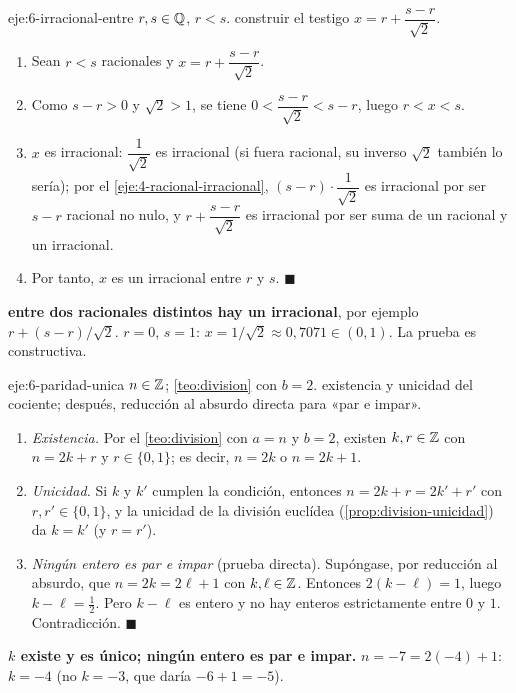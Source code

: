 \begin{solucion}{eje:6-irracional-entre}
\datos $r,s\in\mathbb{Q}$, $r<s$.
\planteamiento construir el testigo $x=r+\dfrac{s-r}{\sqrt2}$.
\pasos
\begin{enumerate}[label=\arabic*.]
  \item Sean $r<s$ racionales y $x=r+\dfrac{s-r}{\sqrt2}$.
  \item Como $s-r>0$ y $\sqrt2>1$, se tiene $0<\dfrac{s-r}{\sqrt2}<s-r$, luego $r<x<s$.
  \item $x$ es irracional: $\dfrac{1}{\sqrt2}$ es irracional (si fuera racional, su inverso $\sqrt2$ también lo sería); por el \cref{eje:4-racional-irracional}, $(s-r)\cdot\dfrac{1}{\sqrt2}$ es irracional por ser $s-r$ racional no nulo, y $r+\dfrac{s-r}{\sqrt2}$ es irracional por ser suma de un racional y un irracional.
  \item Por tanto, $x$ es un irracional entre $r$ y $s$. $\blacksquare$
\end{enumerate}
\resultado \textbf{entre dos racionales distintos hay un irracional}, por ejemplo $r+(s-r)/\sqrt2$.
\comprobacion $r=0$, $s=1$: $x=1/\sqrt2\approx 0{,}7071\in(0,1)$. La prueba es constructiva.
\end{solucion}

\begin{solucion}{eje:6-paridad-unica}
\datos $n\in\mathbb{Z}$; \cref{teo:division} con $b=2$.
\planteamiento existencia y unicidad del cociente; después, reducción al absurdo directa para «par e impar».
\pasos
\begin{enumerate}[label=\arabic*.]
  \item \emph{Existencia.} Por el \cref{teo:division} con $a=n$ y $b=2$, existen $k,r\in\mathbb{Z}$ con $n=2k+r$ y $r\in\{0,1\}$; es decir, $n=2k$ o $n=2k+1$.
  \item \emph{Unicidad.} Si $k$ y $k'$ cumplen la condición, entonces $n=2k+r=2k'+r'$ con $r,r'\in\{0,1\}$, y la unicidad de la división euclídea (\cref{prop:division-unicidad}) da $k=k'$ (y $r=r'$).
  \item \emph{Ningún entero es par e impar} (prueba directa). Supóngase, por reducción al absurdo, que $n=2k=2\ell+1$ con $k,\ell\in\mathbb{Z}$. Entonces $2(k-\ell)=1$, luego $k-\ell=\tfrac12$. Pero $k-\ell$ es entero y no hay enteros estrictamente entre $0$ y $1$. Contradicción. $\blacksquare$
\end{enumerate}
\resultado \textbf{$k$ existe y es único; ningún entero es par e impar.}
\comprobacion $n=-7=2(-4)+1$: $k=-4$ (no $k=-3$, que daría $-6+1=-5$).
\end{solucion}

